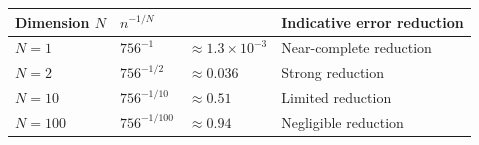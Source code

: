 \begin{tabular}{llll}
\toprule
Dimension $N$ & $n^{-1/N}$ & & Indicative error reduction \\
\midrule
$N = 1$   & $756^{-1}$     & $\approx 1.3\times10^{-3}$ & Near-complete reduction \\
$N = 2$   & $756^{-1/2}$   & $\approx 0.036$            & Strong reduction \\
$N = 10$  & $756^{-1/10}$  & $\approx 0.51$             & Limited reduction \\
$N = 100$ & $756^{-1/100}$ & $\approx 0.94$             & Negligible reduction \\
\bottomrule
\end{tabular}